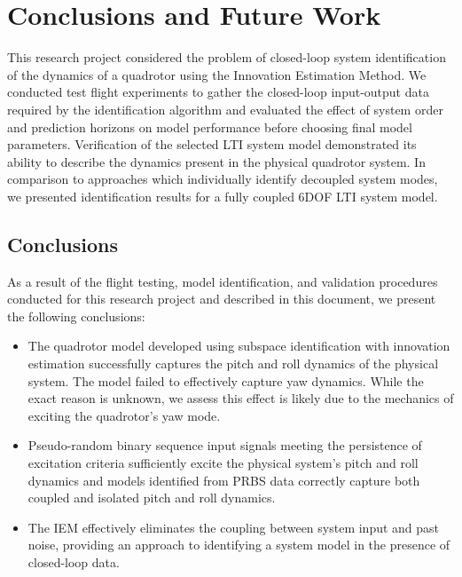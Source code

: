 \chapter{Conclusions and Future Work}
This research project considered the problem of closed-loop system identification of the dynamics of a quadrotor using the Innovation Estimation Method. We conducted test flight experiments to gather the closed-loop input-output data required by the identification algorithm and evaluated the effect of system order and prediction horizons on model performance before choosing final model parameters. Verification of the selected LTI system model demonstrated its ability to describe   the dynamics present in the physical quadrotor system. In comparison to approaches which individually identify decoupled system modes, we presented identification results for a fully coupled 6DOF LTI system model.

\section{Conclusions}
As a result of the flight testing, model identification, and validation procedures conducted for this research project and described in this document, we present the following conclusions:
\begin{itemize}
\item The quadrotor model developed using subspace identification with innovation estimation successfully captures the pitch and roll dynamics of the physical system. The model failed to effectively capture yaw dynamics. While the exact reason is unknown, we assess this effect is likely due to the mechanics of exciting the quadrotor's yaw mode.
\item Pseudo-random binary sequence input signals meeting the persistence of excitation criteria sufficiently excite the physical system's pitch and roll dynamics and models identified from PRBS data correctly capture both coupled and isolated pitch and roll dynamics. 
\item The IEM effectively eliminates the coupling between system input and past noise, providing an approach to identifying a system model in the presence of closed-loop data.
\end{itemize}


